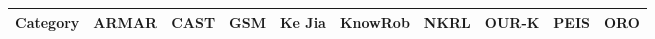 \begin{landscape}
\begin{table}\tiny
\begin{center}
\begin{tabular}{p{0.2cm}p{3.4cm}p{1.6cm}p{1.3cm}p{1.7cm}p{1.5cm}p{2cm}p{2cm}p{1.4cm}p{1.8cm}|p{2cm}}
\toprule
\multicolumn{2}{c}{\bf Category}                                                     & ARMAR \cite{Holzapfel2008}& CAST \cite{Hawes2007}       & GSM \cite{Mavridis2006}     & {\sc Ke Jia} \cite{Chen2010}& {\sc KnowRob} \cite{Tenorth2009a}  & NKRL \cite{Sabri2011}                           & OUR-K \cite{Lim2011}          & PEIS \cite{Daoutis2009}       & ORO \cite{Lemaignan2010}                      \\
                                                                                                                                                                                                                                                                                                                                                                                                                  
\midrule                                                                                                                                                                                                                                                                                                                                                                                                          
                                                                                                                                                                                                                                                                                                                                                                                                                  

\end{tabular}
\end{center}
\end{table}
\end{landscape}
